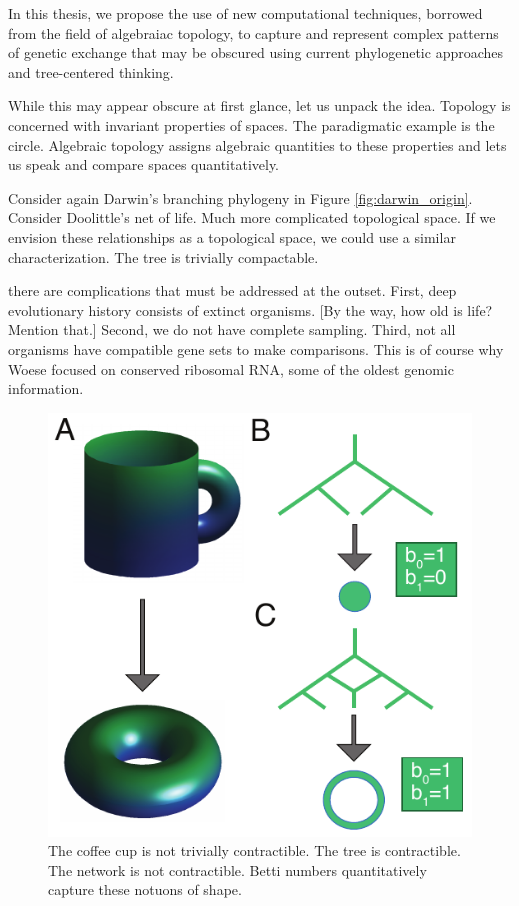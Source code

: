 In this thesis, we propose the use of new computational techniques, borrowed from the field of algebraiac topology, to capture and represent complex patterns of genetic exchange that may be obscured using current phylogenetic approaches and tree-centered thinking.

While this may appear obscure at first glance, let us unpack the idea.
Topology is concerned with invariant properties of spaces.
The paradigmatic example is the circle.
Algebraic topology assigns algebraic quantities to these properties and lets us speak and compare spaces quantitatively.

Consider again Darwin's branching phylogeny in Figure \ref{fig:darwin_origin}.
Consider Doolittle's net of life.
Much more complicated topological space.
If we envision these relationships as a topological space, we could use a similar characterization.
The tree is trivially compactable.

there are complications that must be addressed at the outset.
First, deep evolutionary history consists of extinct organisms.
[By the way, how old is life? Mention that.]
Second, we do not have complete sampling.
Third, not all organisms have compatible gene sets to make comparisons.
This is of course why Woese focused on conserved ribosomal RNA, some of the oldest genomic information.

\begin{figure}
\includegraphics[width=\columnwidth]{./fig/introduction/topology_example.pdf}
\caption[The Paradigmatic Topology Example]{The coffee cup is not trivially contractible. The tree is contractible. The network is not contractible. Betti numbers quantitatively capture these notuons of shape.}
\label{fig:topology_example}
\end{figure}

